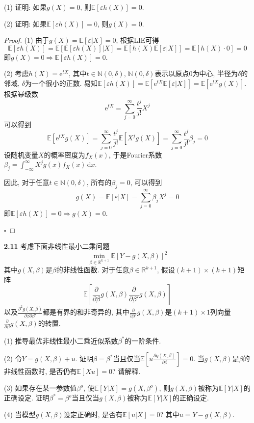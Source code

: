 \documentclass[cn,12pt,math=mtpro2,citestyle=gb7714-2015,bibstyle=gb7714-2015,twocol,mode=simple]{elegantbook}
\newcommand{\E}{\mathbb{E}}
\begin{document}
(1) 证明: 如果$g(X)=0$, 则$\E[\varepsilon h(X)]=0$.

(2) 证明: 如果$\E[\varepsilon h(X)]=0$, 则$g(X)=0$.

\begin{proof}
  (1) 由于$g(X)=\E[\varepsilon|X]=0$, 根据LIE可得
  $$\E[\varepsilon h(X)]=\E[\E[\varepsilon h(X)]|X]=\E[h(X)\E[\varepsilon|X]]=\E[h(X)\cdot 0]=0$$
  即$g(X)=0 \Rightarrow \E[\varepsilon h(X)]=0$.

  (2) 考虑$h(X)=\text{e}^{tX}$, 其中$t \in \mathbb{N}(0, \delta)$, $\mathbb{N}(0,\delta)$表示以原点$0$为中心, 半径为$\delta$的邻域, $\delta$为一个很小的正数. 易知$\E[\varepsilon h(X)]=\E[\text{e}^{tX}\E[\varepsilon|X]]
=\E[\text{e}^{tX}g(X)]$. 根据幂级数
$$\text{e}^{tX}=\sum_{j=0}^{\infty}\frac{t^j}{j!}X^j$$
可以得到
$$\E[\text{e}^{tX}g(X)]=\sum_{j=0}^{\infty}\frac{t^j}{j!}\E[X^jg(X)]=\sum_{j=0}^{\infty}\frac{t^j}{j!}\beta_j=0$$
设随机变量$X$的概率密度为$f_X(x)$, 于是Fourier系数$\displaystyle\beta_j=\int_{-\infty}^{\infty}X^jg(x)f_X(x)\,\text{d}x$.

因此, 对于任意$t \in \mathbb{N}(0, \delta)$, 所有的$\beta_j=0$, 可以得到
$$g(X)=\E[\varepsilon|X]=\sum_{j=0}^{\infty}\beta_jX^j=0$$
即$\E[\varepsilon h(X)]=0 \Rightarrow g(X)=0$.

$\square$
\end{proof}

\textbf{2.11} 考虑下面非线性最小二乘问题
$$\min_{\beta \in \mathbb{R}^{k+1}}\E[Y-g(X,\beta)]^2$$
其中$g(X,\beta)$是$\beta$的非线性函数. 对于任意$\beta \in \mathbb{R}^{k+1}$, 假设$(k+1)\times (k+1)$矩阵
$$\displaystyle \E\left[\frac{\partial}{\partial\beta}g(X,\beta) \frac{\partial}{\partial\beta '}g(X,\beta)\right]$$
以及$\displaystyle \frac{\partial^2g(X,\beta)}{\partial\beta\partial\beta '}$都是有界的和非奇异的, 其中$\displaystyle \frac{\partial}{\partial\beta '}g(X,\beta)$是$(k+1)\times 1$列向量$\displaystyle \frac{\partial}{\partial\beta }g(X,\beta)$的转置.

(1) 推导最优非线性最小二乘近似系数$\beta^{\ast}$的一阶条件.

(2) 令$Y=g(X,\beta)+u$. 证明$\beta=\beta^{\ast}$当且仅当$\displaystyle \E\left[u\frac{\partial g(X,\beta)}{\partial \beta}\right]=0$. 当$g(X,\beta)$是$\beta$的非线性函数时, 是否仍有$\E[Xu]=0$? 请解释.

(3) 如果存在某一参数值$\beta^o$, 使$\E[Y|X]=g(X,\beta^o)$, 则$g(X,\beta)$被称为$\E[Y|X]$的正确设定. 证明$\beta^{\ast}=\beta^o$当且仅当$g(X,\beta)$被称为$\E[Y|X]$的正确设定.

(4) 当模型$g(X,\beta)$设定正确时, 是否有$\E[u|X]=0$? 其中$u=Y-g(X,\beta)$.
\end{document}
